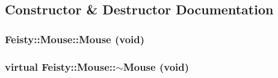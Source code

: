 \subsection{Constructor \& Destructor Documentation}
\hypertarget{class_feisty_1_1_mouse_a818302ae6bc41be0490553fd1541b997}{
\subsubsection[{Mouse}]{\setlength{\rightskip}{0pt plus 5cm}Feisty::Mouse::Mouse (void)}}
\label{class_feisty_1_1_mouse_a818302ae6bc41be0490553fd1541b997}
\hypertarget{class_feisty_1_1_mouse_a287d4659d1b5198d8ea6e18723174dda}{
\subsubsection[{$\sim$Mouse}]{\setlength{\rightskip}{0pt plus 5cm}virtual Feisty::Mouse::$\sim$Mouse (void)}}
\label{class_feisty_1_1_mouse_a287d4659d1b5198d8ea6e18723174dda}


